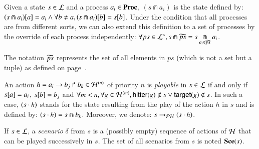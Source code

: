 %
\begin{definition}[$\Cap : \PHl \times \PHproc \rightarrow \PHl$]
\label{def:statecap}
  Given a state $s \in \PHl$ and a process $a_i \in \PHproc$, $(s \Cap a_i)$ is the state defined by:
  $\PHget{(s \Cap a_i)}{a} = a_i \wedge \forall b \neq a, \PHget{(s \Cap a_i)}{b} = \PHget{s}{b}$.
  Under the condition that all processes are from different sorts,
  we can also extend this definition to a set of processes
  by the override of each process independently:
  $\forall ps \in \PHsubl[\PHl], s \Cap \toset{ps} = s \underset{a_i \in \toset{ps}}{\Cap} a_i$.
\end{definition}
The notation $\toset{ps}$ represents the set of all elements in $ps$
(which is not a set but a tuple)
as defined on page~\pageref{notations}.
%
\begin{definition}
\label{def:play}
  An action $h = \PHhit{a_i}{b_j}{b_k} \in \PHa^{(n)}$ of priority $n$ is \emph{playable} in $s \in \PHl$
  if and only if $\PHget{s}{a} = a_i$, $\PHget{s}{b} = b_j$ and $\forall m < n, \forall g \in \PHa^{(m)}, \PHhitter(g) \notin s \vee \PHtarget(g) \notin s$.
  In such a case, $(s \PHplay h)$ stands for the state resulting from the play of the action $h$ in $s$ and is defined by: $(s \PHplay h) = s \Cap b_k$.
  Moreover, we denote: $s \PHPtrans (s \PHplay h)$.

  If $s \in \PHl$,
  a \emph{scenario} $\delta$ from $s$ is a (possibly empty) sequence of actions of $\PHh$
  that can be played successively in $s$.
  The set of all scenarios from $s$ is noted $\Sce(s)$.
\end{definition}




